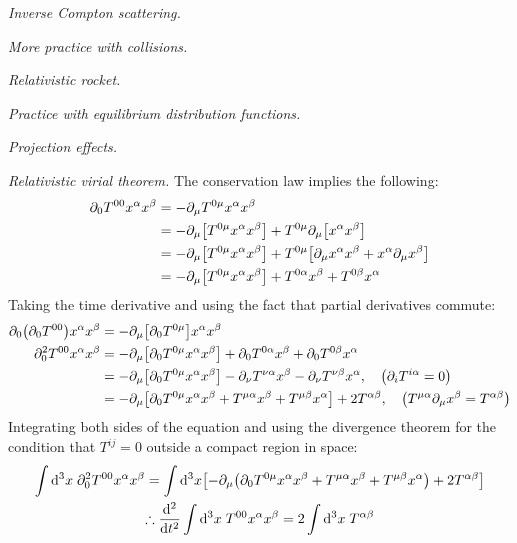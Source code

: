 \documentclass{report}
\begin{document}
\begin{subquests}
\begin{subquests}
		\item \emph{Inverse Compton scattering.}
	\end{subquests}
	

	\item \emph{More practice with collisions.}

	\item \emph{Relativistic rocket.}

	\item \emph{Practice with equilibrium distribution functions.}

	\item \emph{Projection effects.}

	\item \emph{Relativistic virial theorem.}
	The conservation law implies the following:
	\begin{align*}
		\partial_0 T^{00}x^{\alpha}x^{\beta} & = -\partial_{\mu}T^{0\mu}x^{\alpha}x^{\beta} \\
		& = -\partial_{\mu}\bqty{T^{0\mu}x^{\alpha}x^{\beta}} + T^{0\mu}\partial_{\mu}\bqty{x^{\alpha}x^{\beta}} \\
		& = -\partial_{\mu}\bqty{T^{0\mu}x^{\alpha}x^{\beta}} + T^{0\mu}\bqty{\partial_{\mu}x^{\alpha}x^{\beta} + x^{\alpha}\partial_{\mu}x^{\beta}} \\
		& =  -\partial_{\mu}\bqty{T^{0\mu}x^{\alpha}x^{\beta}} + T^{0\alpha}x^{\beta} + T^{0\beta}x^{\alpha}
	\end{align*}
	Taking the time derivative and using the fact that partial derivatives commute:
	\begin{align*}
		\partial_0\pqty{\partial_0 T^{00}}x^{\alpha}x^{\beta} & = -\partial_{\mu}\bqty{\partial_0 T^{0\mu}}x^{\alpha}x^{\beta} \\
		\partial^2_0 T^{00}x^{\alpha}x^{\beta} & = -\partial_{\mu}\bqty{\partial_0 T^{0\mu}x^{\alpha}x^{\beta}} + \partial_0 T^{0\alpha}x^{\beta} + \partial_0 T^{0\beta}x^{\alpha} \\
		& = -\partial_{\mu}\bqty{\partial_0 T^{0\mu}x^{\alpha}x^{\beta}} - \partial_{\nu}T^{\nu\alpha}x^{\beta} - \partial_{\nu}T^{\nu\beta}x^{\alpha}, \quad \pqty{\partial_i T^{i\alpha} = 0} \\
		& = -\partial_{\mu}\bqty{\partial_0 T^{0\mu}x^{\alpha}x^{\beta} + T^{\mu\alpha}x^{\beta} + T^{\mu\beta}x^{\alpha}} + 2 T^{\alpha\beta}, \quad \pqty{T^{\mu\alpha}\partial_{\mu}x^{\beta} = T^{\alpha\beta}}
	\end{align*}
	Integrating both sides of the equation and using the divergence theorem for the condition that $T^{ij} = 0$ outside a compact region in space:
	\begin{gather*}
		\int \dd^3{x}\;\partial^2_0 T^{00} x^{\alpha}x^{\beta} = \int \dd^3{x} \bqty{-\partial_{\mu}\pqty{\partial_0 T^{0\mu}x^{\alpha}x^{\beta} + T^{\mu\alpha}x^{\beta} + T^{\mu\beta}x^{\alpha}} + 2 T^{\alpha\beta}} \\
		\therefore \dv[2]{t}\int \dd^3{x}\;T^{00} x^{\alpha} x^{\beta} = 2 \int \dd^3{x}\; T^{\alpha\beta}
	\end{gather*}


\end{subquests}
\end{document}
